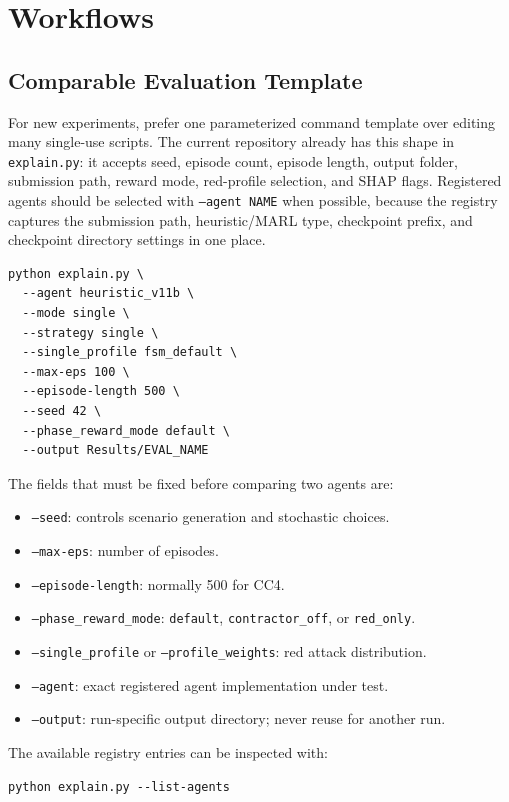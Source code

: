 \section{Workflows}

\subsection{Comparable Evaluation Template}

For new experiments, prefer one parameterized command template over editing many
single-use scripts. The current repository already has this shape in
\texttt{explain.py}: it accepts seed, episode count, episode length, output
folder, submission path, reward mode, red-profile selection, and SHAP flags.
Registered agents should be selected with \texttt{--agent NAME} when possible,
because the registry captures the submission path, heuristic/MARL type, checkpoint
prefix, and checkpoint directory settings in one place.

\begin{lstlisting}
python explain.py \
  --agent heuristic_v11b \
  --mode single \
  --strategy single \
  --single_profile fsm_default \
  --max-eps 100 \
  --episode-length 500 \
  --seed 42 \
  --phase_reward_mode default \
  --output Results/EVAL_NAME
\end{lstlisting}

The fields that must be fixed before comparing two agents are:

\begin{itemize}
  \item \texttt{--seed}: controls scenario generation and stochastic choices.
  \item \texttt{--max-eps}: number of episodes.
  \item \texttt{--episode-length}: normally 500 for CC4.
  \item \texttt{--phase\_reward\_mode}: \texttt{default}, \texttt{contractor\_off}, or \texttt{red\_only}.
  \item \texttt{--single\_profile} or \texttt{--profile\_weights}: red attack distribution.
  \item \texttt{--agent}: exact registered agent implementation under test.
  \item \texttt{--output}: run-specific output directory; never reuse for another run.
\end{itemize}

The available registry entries can be inspected with:

\begin{lstlisting}
python explain.py --list-agents
\end{lstlisting}

